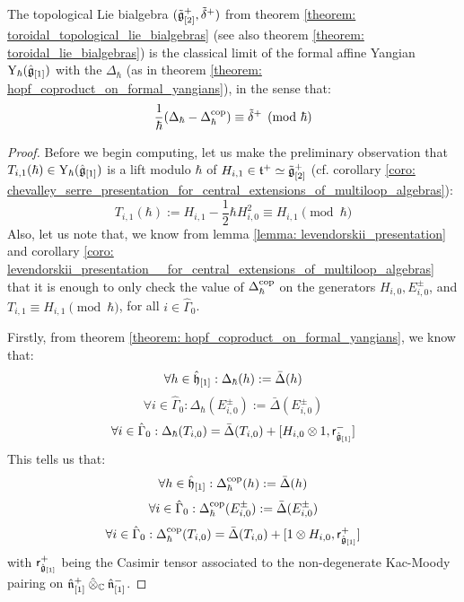         \begin{theorem} \label{theorem: toroidal_lie_algebras_as_classical_limits_of_formal_affine_yangians}
           The topological Lie bialgebra $(\tilde{\mathfrak{g}}_{[2]}^+, \tilde{\delta}^+)$ from theorem \ref{theorem: toroidal_topological_lie_bialgebras} (see also theorem \ref{theorem: toroidal_lie_bialgebras}) is the classical limit of the formal affine Yangian $\mathrm{Y}_{\hbar}(\hat{\mathfrak{g}}_{[1]})$ with the  $\Delta_{\hbar}$ (as in theorem \ref{theorem: hopf_coproduct_on_formal_yangians}), in the sense that:
                $$\frac{1}{\hbar}( \Delta_{\hbar} - \Delta_{\hbar}^{\mathrm{cop}} ) \equiv \tilde{\delta}^+ \pmod{\hbar}$$
        \end{theorem}
            \begin{proof}
                Before we begin computing, let us make the preliminary observation that $T_{i, 1}(\hbar) \in \mathrm{Y}_{\hbar}(\hat{\mathfrak{g}}_{[1]})$ is a lift modulo $\hbar$ of $H_{i, 1} \in \mathfrak{t}^+ \simeq \tilde{\mathfrak{g}}_{[2]}^+$ (cf. corollary \ref{coro: chevalley_serre_presentation_for_central_extensions_of_multiloop_algebras}):
                    $$T_{i, 1}(\hbar) := H_{i, 1} - \frac12 \hbar H_{i, 0}^2 \equiv H_{i, 1} \pmod{\hbar}$$
                Also, let us note that, we know from lemma \ref{lemma: levendorskii_presentation} and corollary \ref{coro: levendorskii_presentation__for_central_extensions_of_multiloop_algebras} that it is enough to only check the value of $\Delta_{\hbar}^{\mathrm{cop}}$ on the generators $H_{i, 0}, E_{i, 0}^{\pm}$, and $T_{i, 1} \equiv H_{i, 1} \pmod{\hbar}$, for all $i \in \hat{\Gamma}_0$.
            
                Firstly, from theorem \ref{theorem: hopf_coproduct_on_formal_yangians}, we know that:
                    $$\forall h \in \hat{\mathfrak{h}}_{[1]}: \Delta_{\hbar}(h) := \bar{\Delta}(h)$$
                    $$\forall i \in \hat{\Gamma}_0: \Delta_{\hbar}(E_{i, 0}^{\pm}) := \bar{\Delta}(E_{i, 0}^{\pm})$$
                    $$\forall i \in \hat{\Gamma}_0: \Delta_{\hbar}(T_{i, 0}) = \bar{\Delta}(T_{i, 0}) + [H_{i, 0} \tensor 1, \sfr_{ \hat{\g}_{[1]} }^-]$$
                This tells us that:
                    $$\forall h \in \hat{\mathfrak{h}}_{[1]}: \Delta_{\hbar}^{\mathrm{cop}}(h) := \bar{\Delta}(h)$$
                    $$\forall i \in \hat{\Gamma}_0: \Delta_{\hbar}^{\mathrm{cop}}(E_{i, 0}^{\pm}) := \bar{\Delta}(E_{i, 0}^{\pm})$$
                    $$\forall i \in \hat{\Gamma}_0: \Delta_{\hbar}^{\cop}(T_{i, 0}) = \bar{\Delta}(T_{i, 0}) + [1 \tensor H_{i, 0}, \sfr_{ \hat{\g}_{[1]} }^+]$$
                with $\mathsf{r}_{\hat{\mathfrak{g}}_{[1]}}^+$ being the Casimir tensor associated to the non-degenerate Kac-Moody pairing on $\hat{\n}_{[1]}^+ \hattensor_{\bbC} \hat{\n}_{[1]}^-$.


\end{proof}
